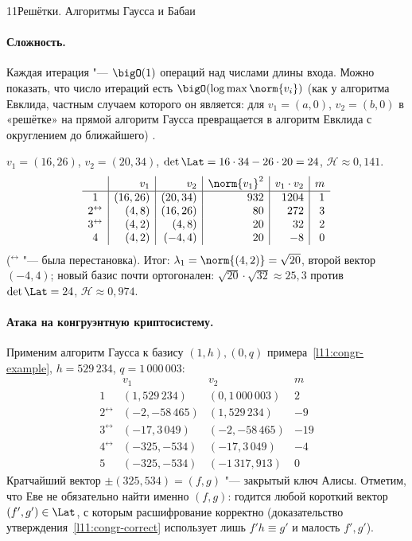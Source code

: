 \begin{lecture}{11}{Решётки. Алгоритмы Гаусса и Бабаи}
\paragraph{Сложность.} Каждая итерация "--- $\bigO(1)$ операций над числами длины входа.
Можно показать, что число итераций есть $\bigO(\log \max \norm{v_i})$ (как у алгоритма Евклида,
частным случаем которого он является: для $v_1 = (a, 0)$, $v_2 = (b, 0)$ в «решётке» на прямой
алгоритм Гаусса превращается в алгоритм Евклида с округлением до ближайшего)
\cite[разд.~17.1]{galbraith}.

\begin{example}\label{l11:gauss-hand}
$v_1 = (16, 26)$, $v_2 = (20, 34)$, $\det \Lat = 16 \cdot 34 - 26 \cdot 20 = 24$,
$\mathcal H \approx 0{,}141$.
\[
\begin{array}{c|r|r|r|r|r}
 & v_1 & v_2 & \norm{v_1}^2 & v_1 \cdot v_2 & m \\ \hline
1 & (16, 26) & (20, 34) & 932 & 1204 & 1 \\
2^{\leftrightarrow} & (4, 8) & (16, 26) & 80 & 272 & 3 \\
3^{\leftrightarrow} & (4, 2) & (4, 8) & 20 & 32 & 2 \\
4 & (4, 2) & (-4, 4) & 20 & -8 & 0
\end{array}
\]
(${}^{\leftrightarrow}$ "--- была перестановка). Итог: $\lambda_1 = \norm{(4, 2)} = \sqrt{20}$,
второй вектор $(-4, 4)$; новый базис почти ортогонален: $\sqrt{20}\cdot\sqrt{32} \approx 25{,}3$
против $\det \Lat = 24$, $\mathcal H \approx 0{,}974$.
\end{example}


\paragraph{Атака на конгруэнтную криптосистему.} Применим алгоритм Гаусса к базису
$(1, h), (0, q)$ примера~\ref{l11:congr-example}, $h = 529\,234$, $q = 1\,000\,003$:
\[
\begin{array}{c|r|r|r}
 & v_1 & v_2 & m \\ \hline
1 & (1, 529\,234) & (0, 1\,000\,003) & 2 \\
2^{\leftrightarrow} & (-2, -58\,465) & (1, 529\,234) & -9 \\
3^{\leftrightarrow} & (-17, 3\,049) & (-2, -58\,465) & -19 \\
4^{\leftrightarrow} & (-325, -534) & (-17, 3\,049) & -4 \\
5 & (-325, -534) & (-1\,317, 913) & 0
\end{array}
\]
Кратчайший вектор $\pm(325, 534) = (f, g)$ "--- закрытый ключ Алисы. Отметим, что Еве не
обязательно найти именно $(f, g)$: годится любой короткий вектор $(f', g') \in \Lat$, с которым
расшифрование корректно (доказательство утверждения~\ref{l11:congr-correct} использует лишь
$f'h \equiv g'$ и малость $f', g'$).


\end{lecture}
